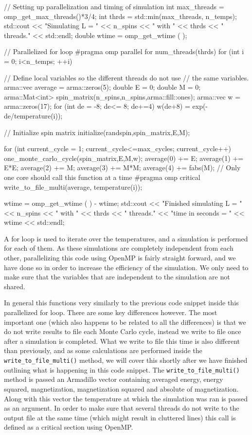 \documentclass[reprint,english,notitlepage]{revtex4-1}  %
\begin{document}
\begin{cpp}
// Setting up parallelization and timing of simulation
int max_threads = omp_get_max_threads()*3/4;
int thrds = std::min(max_threads, n_temps);
std::cout << "Simulating L = " << n_spins << " with " 
		  << thrds << " threads." << std::endl;
double wtime = omp_get_wtime ( );

// Parallelized for loop
#pragma omp parallel for num_threads(thrds)
for (int i = 0; i<n_temps; ++i) {
  // Define local variables so the different threads do not use 
  // the same variables.
  arma::vec average = arma::zeros(5);
  double E = 0;
  double M = 0;
  arma::Mat<int> spin_matrix(n_spins,n_spins,arma::fill::ones);
  arma::vec w = arma::zeros(17);
  for (int de = -8; de<= 8; de+=4) {
    w(de+8) = exp(-de/temperature(i));
  }

  // Initialize spin matrix
  initialize(randspin,spin_matrix,E,M);

  for (int current_cycle = 1; current_cycle<=max_cycles; 
  	   current_cycle++){
    one_monte_carlo_cycle(spin_matrix,E,M,w);
    average(0) += E;
    average(1) += E*E;
    average(2) += M;
    average(3) += M*M;
    average(4) += fabs(M);
  }
  // Only one core should call this function at a time
  #pragma omp critical
  write_to_file_multi(average, temperature(i));
}
wtime = omp_get_wtime ( ) - wtime;
std::cout << "Finished simulating L = " << n_spins << " with " 
	      << thrds << " threads."
  		  << "\nElapsed time in seconds = " << wtime << std::endl;
\end{cpp} 

A for loop is used to iterate over the temperatures, and a simulation is performed for each of them. As these simulations are completely independent from each other, parallelizing this code using OpenMP is fairly straight forward, and we have done so in order to increase the efficiency of the simulation. We only need to make sure that the variables that are independent to the simulation are not shared. 

In general this functions very similarly to the previous code snippet inside this parallelized for loop. There are some key differences however. The most important one (which also happens to be related to all the differences) is that we do not write results to file each Monte Carlo cycle, instead we write to file once after a simulation is completed. What we write to file this time is also different than previously, and as some calculations are performed inside the \verb+write_to_file_multi()+ method, we will cover this shortly after we have finished outlining what is happening in this code snippet. The \verb+write_to_file_multi()+ method is passed an Armadillo \citep{Armadillo} vector containing averaged energy, energy squared, magnetization, magnetization squared and absolute of magnetization. Along with this vector the temperature at which the simulation was ran is passed as an argument. In order to make sure that several threads do not write to the output file at the same time (which might result in cluttered lines) this call is defined as a critical section using OpenMP.
\end{document}
